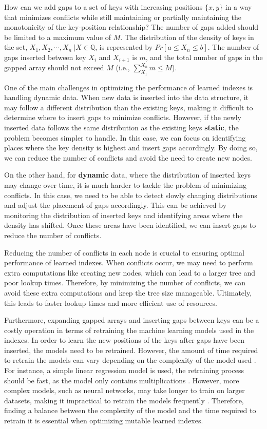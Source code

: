 \documentclass[11pt,a4paper]{article}
\begin{document}
How can we add gaps to a set of keys with increasing positions $\{x, y\}$ in a way that minimizes conflicts while still maintaining or partially maintaining the monotonicity of the key-position relationship? The number of gaps added should be limited to a maximum value of $M$. The distribution of the density of keys in the set, ${X_1, X_2, \cdots, X_n\ | X \in \mathbb{Q}}$, is represented by $Pr[a \leq X_n \leq b]$. The number of gaps inserted between key $X_i$ and $X_{i+1}$ is $m$, and the total number of gaps in the gapped array should not exceed $M$ (i.e., $\sum_{X_1}^{X_n}{m} \leq M$).

One of the main challenges in optimizing the performance of learned indexes is handling dynamic data. When new data is inserted into the data structure, it may follow a different distribution than the existing keys, making it difficult to determine where to insert gaps to minimize conflicts. However, if the newly inserted data follows the same distribution as the existing keys \textbf{static}, the problem becomes simpler to handle. In this case, we can focus on identifying places where the key density is highest and insert gaps accordingly. By doing so, we can reduce the number of conflicts and avoid the need to create new nodes.

On the other hand, for \textbf{dynamic} data, where the distribution of inserted keys may change over time, it is much harder to tackle the problem of minimizing conflicts. In this case, we need to be able to detect slowly changing distributions and adjust the placement of gaps accordingly. This can be achieved by monitoring the distribution of inserted keys and identifying areas where the density has shifted. Once these areas have been identified, we can insert gaps to reduce the number of conflicts.

Reducing the number of conflicts in each node is crucial to ensuring optimal performance of learned indexes. When conflicts occur, we may need to perform extra computations like creating new nodes, which can lead to a larger tree and poor lookup times. Therefore, by minimizing the number of conflicts, we can avoid these extra computations and keep the tree size manageable. Ultimately, this leads to faster lookup times and more efficient use of resources.

Furthermore, expanding gapped arrays and inserting gaps between keys can be a costly operation in terms of retraining the machine learning models used in the indexes. In order to learn the new positions of the keys after gaps have been inserted, the models need to be retrained. However, the amount of time required to retrain the models can vary depending on the complexity of the model used \cite{CasedLearnedIndex}. For instance, a simple linear regression model is used, the retraining process should be fast, as the model only contains multiplications \cite{CasedLearnedIndex,ALEX,LIPP}. However, more complex models, such as neural networks, may take longer to train on larger datasets, making it impractical to retrain the models frequently \cite{CasedLearnedIndex}. Therefore, finding a balance between the complexity of the model and the time required to retrain it is essential when optimizing mutable learned indexes.
\end{document}

